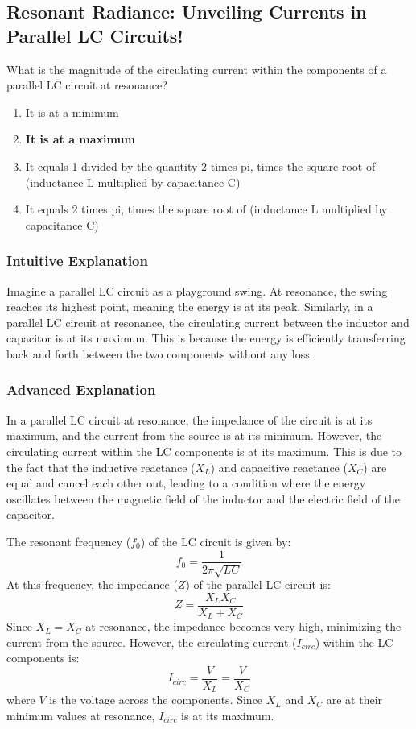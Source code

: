 \subsection{Resonant Radiance: Unveiling Currents in Parallel LC Circuits!}

\begin{tcolorbox}[colback=gray!10!white,colframe=black!75!black,title=E5A06] What is the magnitude of the circulating current within the components of a parallel LC circuit at resonance?
    \begin{enumerate}[label=\Alph*.]
        \item It is at a minimum
        \item \textbf{It is at a maximum}
        \item It equals 1 divided by the quantity 2 times pi, times the square root of (inductance L multiplied by capacitance C)
        \item It equals 2 times pi, times the square root of (inductance L multiplied by capacitance C)
    \end{enumerate}
\end{tcolorbox}

\subsubsection{Intuitive Explanation}
Imagine a parallel LC circuit as a playground swing. At resonance, the swing reaches its highest point, meaning the energy is at its peak. Similarly, in a parallel LC circuit at resonance, the circulating current between the inductor and capacitor is at its maximum. This is because the energy is efficiently transferring back and forth between the two components without any loss.

\subsubsection{Advanced Explanation}
In a parallel LC circuit at resonance, the impedance of the circuit is at its maximum, and the current from the source is at its minimum. However, the circulating current within the LC components is at its maximum. This is due to the fact that the inductive reactance (\(X_L\)) and capacitive reactance (\(X_C\)) are equal and cancel each other out, leading to a condition where the energy oscillates between the magnetic field of the inductor and the electric field of the capacitor.

The resonant frequency (\(f_0\)) of the LC circuit is given by:
\[
f_0 = \frac{1}{2\pi\sqrt{LC}}
\]
At this frequency, the impedance (\(Z\)) of the parallel LC circuit is:
\[
Z = \frac{X_L X_C}{X_L + X_C}
\]
Since \(X_L = X_C\) at resonance, the impedance becomes very high, minimizing the current from the source. However, the circulating current (\(I_{circ}\)) within the LC components is:
\[
I_{circ} = \frac{V}{X_L} = \frac{V}{X_C}
\]
where \(V\) is the voltage across the components. Since \(X_L\) and \(X_C\) are at their minimum values at resonance, \(I_{circ}\) is at its maximum.

